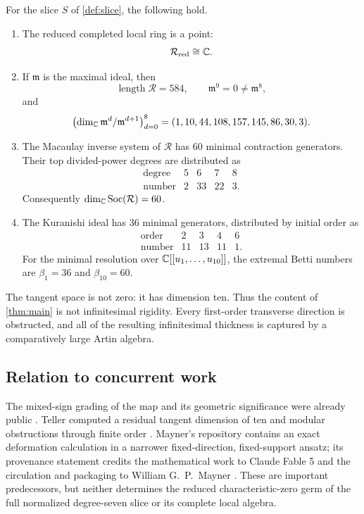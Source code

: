 \documentclass[11pt,reqno]{amsart}
\begin{document}
\begin{theorem}
\label{thm:main}
For the slice \(S\) of \cref{def:slice}, the following hold.
\begin{enumerate}[label=(\roman*)]
\item The reduced completed local ring is a point:
\[
\mathcal R_{\mathrm{red}}\cong\mathbb C.
\]
\item If \(\mathfrak m\) is the maximal ideal, then
\[
\operatorname{length}\mathcal R=584,\qquad
\mathfrak m^9=0\ne\mathfrak m^8,
\]
and
\[
\bigl(\dim_\mathbb C\mathfrak m^d/\mathfrak m^{d+1}\bigr)_{d=0}^8
=(1,10,44,108,157,145,86,30,3).
\]
\item The Macaulay inverse system of \(\mathcal R\) has 60 minimal
contraction generators.  Their top divided-power degrees are distributed as
\[
\begin{array}{c|rrrr}
\text{degree}&5&6&7&8\\ \hline
\text{number}&2&33&22&3.
\end{array}
\]
Consequently
\(\dim_\mathbb C\operatorname{Soc}(\mathcal R)=60\).
\item The Kuranishi ideal has 36 minimal generators, distributed by initial
order as
\[
\begin{array}{c|rrrr}
\text{order}&2&3&4&6\\ \hline
\text{number}&11&13&11&1.
\end{array}
\]
For the minimal resolution over
\(\mathbb C[[u_1,\ldots,u_{10}]]\), the extremal Betti numbers are
\(\beta_1=36\) and \(\beta_{10}=60\).
\end{enumerate}
\end{theorem}

The tangent space is not zero: it has dimension ten.  Thus the content of
\cref{thm:main} is not infinitesimal rigidity.  Every first-order transverse
direction is obstructed, and all of the resulting infinitesimal thickness is
captured by a comparatively large Artin algebra.

\subsection*{Relation to concurrent work}

The mixed-sign grading of the map and its geometric significance were
already public \cite{shaska2026graded}.  Teller computed a residual tangent
dimension of ten and modular obstructions through finite order
\cite{teller2026rigidity}.  Mayner's repository contains an exact deformation
calculation in a narrower fixed-direction, fixed-support ansatz; its
provenance statement credits the mathematical work to Claude Fable 5 and the
circulation and packaging to William G.\ P.\ Mayner
\cite{mayner2026structural}.  These are important predecessors, but neither
determines the reduced characteristic-zero germ of the full normalized
degree-seven slice or its complete local algebra.
\end{document}
